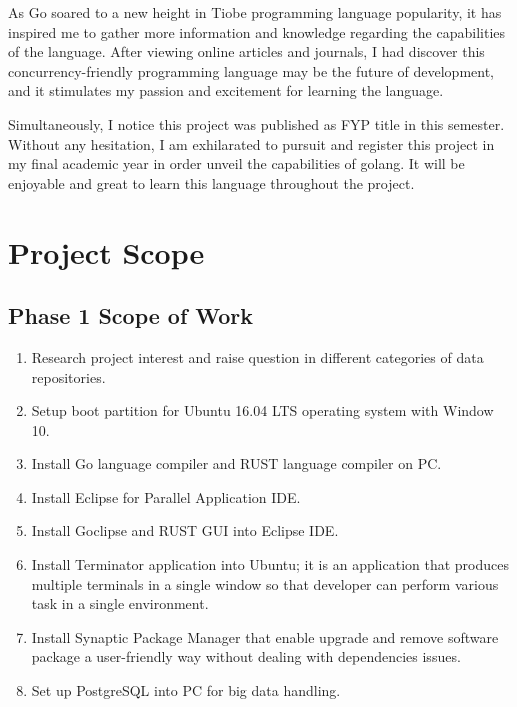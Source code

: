 As Go soared to a new height in Tiobe programming language popularity, it has inspired me to gather more information and knowledge regarding the capabilities of the language. After viewing online articles and journals, I had discover this concurrency-friendly programming language may be the future of development, and it stimulates my passion and excitement for learning the language.

Simultaneously, I notice this project was published as FYP title in this semester. Without any hesitation, I am exhilarated to pursuit and register this project in my final academic year in order unveil the capabilities of golang. It will be enjoyable and great to learn this language throughout the project.



\section{Project Scope}

\subsection{Phase 1 Scope of Work}

\begin{enumerate}[topsep=0pt,itemsep=-1ex,partopsep=1ex,parsep=1.5ex]
	
\item Research project interest and raise question in different categories of data repositories.  
\item Setup boot partition for Ubuntu 16.04 LTS operating system with Window 10.
\item Install Go language compiler and RUST language compiler on PC. 
\item Install Eclipse for Parallel Application IDE.
\item Install Goclipse and RUST GUI into Eclipse IDE. 
\item Install Terminator application into Ubuntu; it is an application that produces multiple terminals in a single window so that developer can perform various task in a single environment.
\item Install Synaptic Package Manager that enable upgrade and remove software package a user-friendly way without dealing with dependencies issues.
\item Set up PostgreSQL into PC for big data handling.

\end{enumerate}

